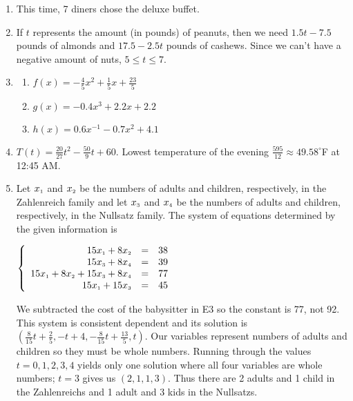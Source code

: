 \documentclass{ximera}
\begin{document}
\begin{enumerate}
\setcounter{enumi}{\value{HW}}

\item  This time, 7 diners chose the deluxe buffet.

\item  If $t$ represents the amount (in pounds) of peanuts, then we need $1.5 t - 7.5$ pounds of almonds and $17.5 - 2.5t$ pounds of cashews.  Since we can't have a negative amount of nuts, $5 \leq t \leq 7$. 

\item 

\begin{multicols}{3}

 \begin{enumerate}

\item $f(x) = -\frac{4}{5} x^2+\frac{1}{5} x + \frac{23}{5}$

\item  $g(x) = -0.4 x^3 + 2.2 x + 2.2$

\item $h(x) = 0.6 x^{-1} - 0.7 x^2 + 4.1$

\end{enumerate}

\end{multicols}

\item  $T(t) = \frac{20}{27} t^2 - \frac{50}{9} t + 60$.  Lowest temperature of the evening $\frac{595}{12} \approx 49.58^{\circ}$F at 12:45 AM.

\newpage

\item Let $x_{\mbox{\tiny$1$}}$ and $x_{\mbox{\tiny$2$}}$ be the numbers of adults and children, respectively, in the Zahlenreich family and let $x_{\mbox{\tiny$3$}}$ and $x_{\mbox{\tiny$4$}}$ be the numbers of adults and children, respectively, in the Nullsatz family.  The system of equations determined by the given information is 

$\left\{ \begin{array}{rcr} 15x_{\mbox{\tiny$1$}} + 8x_{\mbox{\tiny$2$}} & = & 38 \\ 
15x_{\mbox{\tiny$3$}} + 8x_{\mbox{\tiny$4$}} & = & 39  \\  
15x_{\mbox{\tiny$1$}} +  8x_{\mbox{\tiny$2$}} + 15x_{\mbox{\tiny$3$}} + 8x_{\mbox{\tiny$4$}} & = & 77 \\
15x_{\mbox{\tiny$1$}} + 15x_{\mbox{\tiny$3$}} & = & 45  \end{array} \right.$

We subtracted the cost of the babysitter in E3 so the constant is 77, not 92.  This system is consistent dependent and its solution is $\left(\frac{8}{15}t + \frac{2}{5}, -t + 4, -\frac{8}{15}t + \frac{13}{5}, t \right)$.  Our variables represent numbers of adults and children so they must be whole numbers.  Running through the values $t = 0, 1, 2, 3, 4$ yields only one solution where all four variables are whole numbers; $t = 3$ gives us $(2, 1, 1, 3)$.  Thus there are 2 adults and 1 child in the Zahlenreichs and 1 adult and 3 kids in the Nullsatzs.


\end{enumerate}
\end{document}
